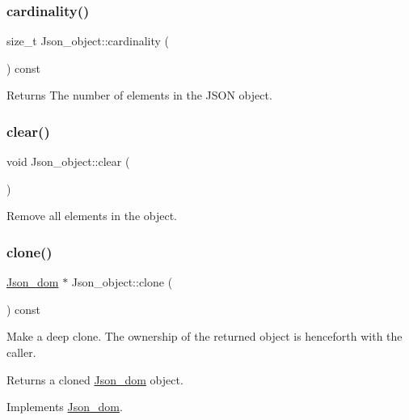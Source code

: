 \subsubsection{\texorpdfstring{cardinality()}{cardinality()}}
{\footnotesize\ttfamily size\+\_\+t Json\+\_\+object\+::cardinality (\begin{DoxyParamCaption}{ }\end{DoxyParamCaption}) const}

\begin{DoxyReturn}{Returns}
The number of elements in the J\+S\+ON object. 
\end{DoxyReturn}
\mbox{\label{classJson__object_adb32a3a28d5bb946ab618872808aca3b}} 
\subsubsection{\texorpdfstring{clear()}{clear()}}
{\footnotesize\ttfamily void Json\+\_\+object\+::clear (\begin{DoxyParamCaption}{ }\end{DoxyParamCaption})}

Remove all elements in the object. \mbox{\label{classJson__object_a2a723c5eb14d6532aa85097b9719f2c7}} 
\subsubsection{\texorpdfstring{clone()}{clone()}}
{\footnotesize\ttfamily \mbox{\hyperlink{classJson__dom}{Json\+\_\+dom}} $\ast$ Json\+\_\+object\+::clone (\begin{DoxyParamCaption}{ }\end{DoxyParamCaption}) const\hspace{0.3cm}{\ttfamily [virtual]}}

Make a deep clone. The ownership of the returned object is henceforth with the caller.

\begin{DoxyReturn}{Returns}
a cloned \mbox{\hyperlink{classJson__dom}{Json\+\_\+dom}} object. 
\end{DoxyReturn}


Implements \mbox{\hyperlink{classJson__dom_a03c529d590cc4cdb747ccb82f4b70fb5}{Json\+\_\+dom}}.

